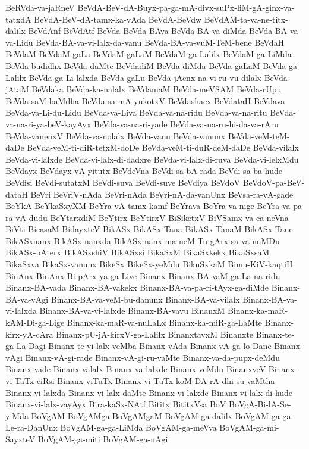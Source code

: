 {BeRVda-va-jaRneV
BeVdA-BeV-dA-Buyx-pa-ga-mA-divx-suPx-liM-gA-ginx-va-tatxdA
BeVdA-BeV-dA-tamx-ka-vAda
BeVdA-BeVdw
BeVdAM-ta-va-ne-titx-dalilx
BeVdAnf
BeVdAtf
BeVda
BeVda-BAva
BeVda-BA-va-diMda
BeVda-BA-va-va-Lidu
BeVda-BA-va-vi-lalx-da-vanu
BeVda-BA-va-vuM-TeM-bene
BeVdaH
BeVdaM
BeVdaM-gaLa
BeVdaM-gaLaM
BeVdaM-ga-Lalilx
BeVdaM-ga-LiMda
BeVda-budidhx
BeVda-daMte
BeVdadiM
BeVda-diMda
BeVda-gaLaM
BeVda-ga-Lalilx
BeVda-ga-Li-lalxda
BeVda-gaLu
BeVda-jAcnx-na-vi-ru-vu-dilalx
BeVda-jAtaM
BeVdaka
BeVda-ka-nalalx
BeVdamaM
BeVda-meVSAM
BeVda-rUpu
BeVda-saM-baMdha
BeVda-sa-mA-yukotxV
BeVdashacx
BeVdataH
BeVdava
BeVda-va-Li-du-Lidu
BeVda-va-Liva
BeVda-va-na-ridu
BeVda-va-na-ritu
BeVda-va-na-ri-ya-beV-kayAyx
BeVda-va-na-ri-yade
BeVda-va-na-ru-hi-da-va-rAru
BeVda-vanenxV
BeVda-va-nolalx
BeVda-vanu
BeVda-vanunx
BeVda-veM-teM-daDe
BeVda-veM-ti-diR-tetxM-doDe
BeVda-veM-ti-duR-deM-daDe
BeVda-vilalx
BeVda-vi-lalxde
BeVda-vi-lalx-di-dadxre
BeVda-vi-lalx-di-ruva
BeVda-vi-lelxMdu
BeVdayx
BeVdayx-vA-yitutx
BeVdeVna
BeVdi-sa-bA-rada
BeVdi-sa-ba-hude
BeVdisi
BeVdi-sutatxM
BeVdi-suva
BeVdi-suve
BeVdiya
BeVdoV
BeVdoV-pa-BeV-dataH
BeVri
BeVriV-nAda
BeVri-nAda
BeVri-nA-da-vanUnx
BeVsa-ra-vA-gade
BeYkA
BeYkaSxyXM
BeYra-vA-tamx-kamf
BeYrava
BeYra-va-nige
BeYra-va-pa-ra-vA-dudu
BeYtarxdiM
BeYtirx
BeYtirxV
BiSiketxV
BiVSamx-va-ca-neVna
BiVti
BicasaM
BidayxteV
BikASx
BikASx-Tana
BikASx-TanaM
BikASx-Tane
BikASxnanx
BikASx-nanxda
BikASx-nanx-ma-neM-Tu-gArx-sa-va-nuMDu
BikASx-pAterx
BikASxshiV
BikASxsi
BikaSxM
BikaSxkekx
BikaSxsaM
BikaSxva
BikaSx-vanunx
BikeSx
BikeSx-yeMdu
BikuSxkaM
Bimu-KiV-kaqtiH
BinAnx
BinAnx-Bi-pArx-ya-ga-Live
Binanx
Binanx-BA-vaM-ga-La-na-ridu
Binanx-BA-vada
Binanx-BA-vakekx
Binanx-BA-va-pa-ri-tAyx-ga-diMde
Binanx-BA-va-vAgi
Binanx-BA-va-veM-bu-danunx
Binanx-BA-va-vilalx
Binanx-BA-va-vi-lalxda
Binanx-BA-va-vi-lalxde
Binanx-BA-vavu
BinanxM
Binanx-ka-maR-kAM-Di-ga-Lige
Binanx-ka-maR-va-nuLaLx
Binanx-ka-miR-ga-LaMte
Binanx-kirx-yA-cAra
Binanx-pU-jA-kirxV-ga-Lalilx
BinanxtavxM
Binanxte
Binanx-te-ga-La-Dagi
Binanx-te-yi-lalx-veMba
Binanx-vAda
Binanx-vA-ga-lo-Dane
Binanx-vAgi
Binanx-vA-gi-rade
Binanx-vA-gi-ru-vaMte
Binanx-va-da-pupx-deMdu
Binanx-vade
Binanx-valalx
Binanx-va-lalxde
Binanx-veMdu
BinanxveV
Binanx-vi-TaTx-ciRsi
Binanx-viTuTx
Binanx-vi-TuTx-koM-DA-rA-dhi-su-vaMtha
Binanx-vi-lalxda
Binanx-vi-lalx-daMte
Binanx-vi-lalxde
Binanx-vi-lalx-di-hude
Binanx-vi-lalx-vayAyx
Bira-kaSx-NAtf
Bititx
BititxVsa
BoV
BoVgA-Bi-lA-Se-yiMda
BoVgAM
BoVgAMga
BoVgAMgaM
BoVgAM-ga-dalilx
BoVgAM-ga-ga-Le-ra-DanUnx
BoVgAM-ga-ga-LiMda
BoVgAM-ga-meVva
BoVgAM-ga-mi-SayxteV
BoVgAM-ga-miti
BoVgAM-ga-nAgi
}
